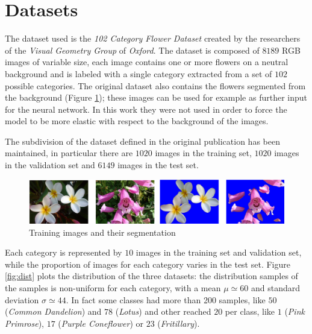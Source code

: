 \section{Datasets}
The dataset used is the \textit{102 Category Flower Dataset} \cite{Nilsback08} created by the researchers of the \textit{Visual Geometry Group} of \textit{Oxford}. The dataset is composed of $8189$ RGB images of variable size, each image contains one or more flowers on a neutral background and is labeled with a single category extracted from a set of $102$ possible categories. The original dataset also contains the flowers segmented from the background (Figure \ref{fig_dataset}); these images can be used for example as further input for the neural network. In this work they were not used in order to force the model to be more elastic with respect to the background of the images. \par
The subdivision of the dataset defined in the original publication has been maintained, in particular there are $1020$ images in the training set, $1020$ images in the validation set and $6149$ images in the test set.

\begin{figure}[ht!]
\centering  
\includegraphics[width=1.0\textwidth]{images/dataset.png} 
\caption{Training images and their segmentation}
\label{fig_dataset}
\end{figure}

Each category is represented by $10$ images in the training set and validation set, while the proportion of images for each category varies in the test set. Figure \ref{fig:dist} plots the distribution of the three datasets: the distribution samples of the samples is non-uniform for each category, with a mean $\mu \simeq 60$ and standard deviation $\sigma \simeq 44$. In fact some classes had more than 200 samples, like  $50$ (\textit{Common Dandelion}) and $78$ (\textit{Lotus}) and other reached $20$ per class, like $1$ (\textit{Pink Primrose}), $17$ (\textit{Purple Coneflower}) or $23$ (\textit{Fritillary}).

